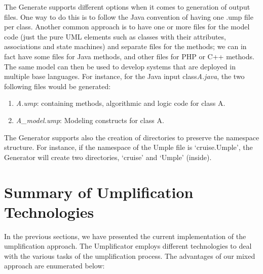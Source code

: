 The Generate supports different options when it comes to generation of output files.  One way to do this is to follow the Java convention of having one .ump file per class. Another common approach is to have one or more files for the model code (just the pure UML elements such as classes with their attributes, associations and state machines) and separate files for the methods; we can in fact have some files for Java methods, and other files for PHP or C++ methods. The same model can then be used to develop systems that are deployed in multiple base languages. For instance, for the Java  input class\textit{A.java}, the two following files would be generated:

\begin{enumerate}
\item \textit{A.ump}: containing methods, algorithmic and logic code for class A.
\item \textit{A\_model.ump}: Modeling constructs for class A.
\end{enumerate}

The Generator supports also the creation of directories to preserve the namespace structure. For instance, if the namespace of the Umple file is `cruise.Umple', the Generator will create two directories, `cruise' and `Umple' (inside).

\section{Summary of Umplification Technologies}

In the previous sections, we have presented the current implementation of the umplification approach. The Umplificator employs different technologies to deal with the various tasks of the umplification process. 
The advantages of our mixed approach are enumerated below:

